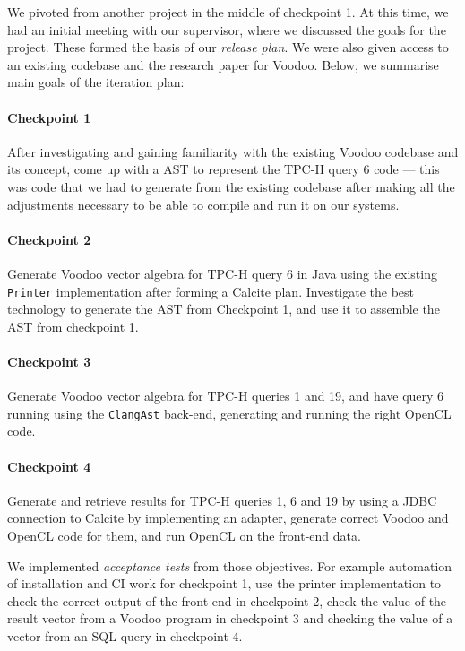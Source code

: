 We pivoted from another project in the middle of checkpoint 1. At this time, we had an initial meeting with our supervisor, where we discussed the goals for the project. These formed the basis of our \emph{release plan}. We were also given access to an existing codebase and the research paper for Voodoo. Below, we summarise main goals of the iteration plan:

\paragraph{Checkpoint 1} 
After investigating and gaining familiarity with the existing Voodoo codebase and its concept, come up with a AST to represent the TPC-H query 6 code — this was code that we had to generate from the existing codebase after making all the adjustments necessary to be able to compile and run it on our systems.

\paragraph{Checkpoint 2}
Generate Voodoo vector algebra for TPC-H query 6 in Java using the existing \texttt{Printer} implementation after forming a Calcite plan. Investigate the best technology to generate the AST from Checkpoint 1, and use it to assemble the AST from checkpoint 1.

\paragraph{Checkpoint 3}
Generate Voodoo vector algebra for TPC-H queries 1 and 19, and have query 6 running using the \texttt{ClangAst} back-end, generating and running the right OpenCL code.

\paragraph{Checkpoint 4}
Generate and retrieve results for TPC-H queries 1, 6 and 19 by using a JDBC connection to Calcite by implementing an adapter, generate correct Voodoo and OpenCL code for them, and run OpenCL on the front-end data.

We implemented \emph{acceptance tests} from those objectives. For example automation of installation and CI work for checkpoint 1, use the printer implementation to check the correct output of the front-end in checkpoint 2, check the value of the result vector from a Voodoo program in checkpoint 3 and checking the value of a vector from an SQL query in checkpoint 4.

